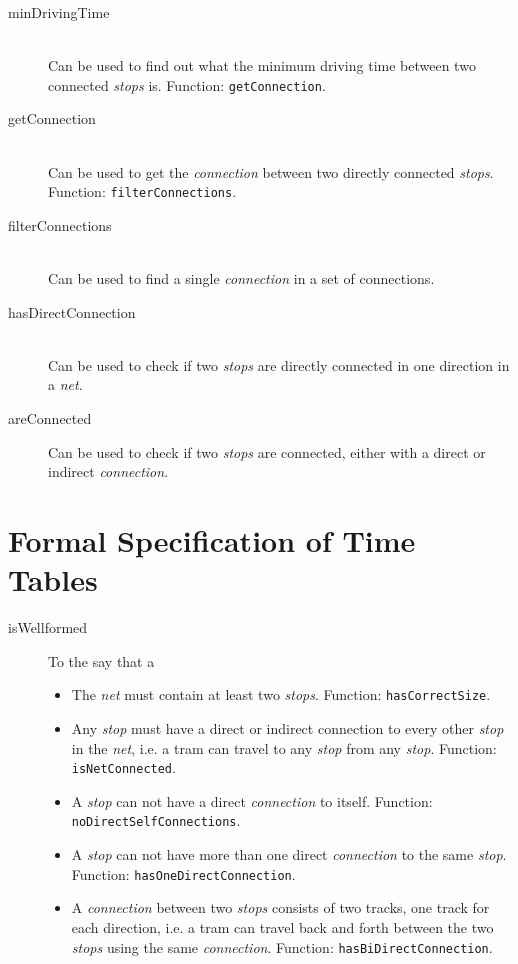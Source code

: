 \documentclass[a4]{article}
\begin{document}
\begin{description}
    \item[minDrivingTime] \hfill \\ Can be used to find out what the minimum driving time between two connected \emph{stops} is. Function: \verb=getConnection=.
    \item[getConnection] \hfill \\ Can be used to get the \emph{connection} between two directly connected \emph{stops}. Function: \verb=filterConnections=.
    \item[filterConnections] \hfill \\ Can be used to find a single \emph{connection} in a set of connections.
    \item[hasDirectConnection] \hfill \\ Can be used to check if two \emph{stops} are directly connected in one direction in a \emph{net}.
    \item[areConnected] Can be used to check if two \emph{stops} are connected, either with a direct or indirect \emph{connection}.
\end{description}  

\section{Formal Specification of Time Tables}



\begin{description}
    \item[isWellformed] \hfill To the say that a 
        \begin{itemize}
            \item The \emph{net} must contain at least two \emph{stops}. Function: \verb=hasCorrectSize=.
            \item Any \emph{stop} must have a direct or indirect connection to every other \emph{stop} in the \emph{net}, i.e. a tram can travel to any \emph{stop} from any \emph{stop}. Function: \verb=isNetConnected=.
            \item A \emph{stop} can not have a direct \emph{connection} to itself. Function: \verb=noDirectSelfConnections=.
            \item A \emph{stop} can not have more than one direct \emph{connection} to the same \emph{stop}. Function: \verb=hasOneDirectConnection=.
            \item A \emph{connection} between two \emph{stops} consists of two tracks, one track for each direction, i.e. a tram can travel back and forth between the two \emph{stops} using the same \emph{connection}. Function: \verb=hasBiDirectConnection=.
        \end{itemize}
\end{description}
\end{document}
